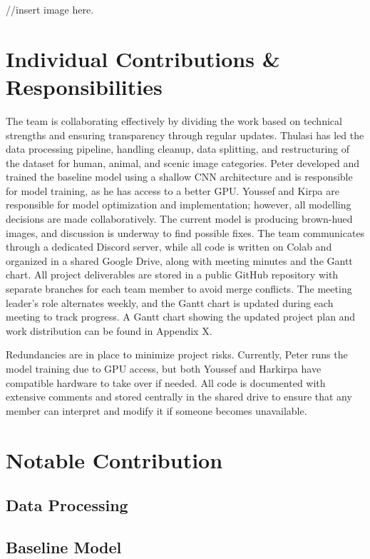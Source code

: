 \documentclass{article} %
\begin{document}
//insert image here. 

\section{Individual Contributions \& Responsibilities}
The team is collaborating effectively by dividing the work based on technical strengths and ensuring transparency through regular updates. Thulasi has led the data processing pipeline, 
handling cleanup, data splitting, and restructuring of the dataset for human, animal, and scenic image categories. Peter developed and trained the baseline model using a shallow CNN architecture 
and is responsible for model training, as he has access to a better GPU. Youssef and Kirpa are responsible for model optimization and implementation; however, all modelling decisions are made collaboratively. 
The current model is producing brown-hued images, and discussion is underway to find possible fixes. The team communicates through a dedicated Discord server, while all code is written on Colab and organized 
in a shared Google Drive, along with meeting minutes and the Gantt chart. All project deliverables are stored in a public GitHub repository with separate branches for each team member to avoid merge conflicts. 
The meeting leader's role alternates weekly, and the Gantt chart is updated during each meeting to track progress. A Gantt chart showing the updated project plan and work distribution can be found in Appendix X.

Redundancies are in place to minimize project risks. Currently, Peter runs the model training due to GPU access, but both Youssef and Harkirpa have compatible hardware to take over if needed. All code is documented 
with extensive comments and stored centrally in the shared drive to ensure that any member can interpret and modify it if someone becomes unavailable.

\section{Notable Contribution}

\subsection{Data Processing}

\subsection{Baseline Model}
\end{document}
